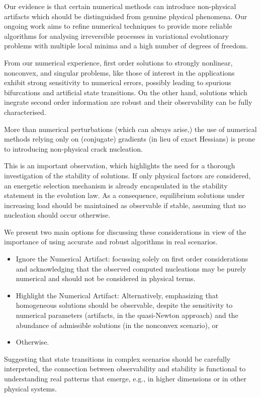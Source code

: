 \documentclass[10pt]{article}
\begin{document}
Our evidence is that certain numerical methods can introduce non-physical artifacts which should be distinguished from genuine physical phenomena. Our ongoing work aims to refine numerical techniques to provide more reliable algorithms for analysing irreversible processes in variational evolutionary problems with multiple local minima and a high number of degrees of freedom.

From our numerical experience, first order solutions to strongly nonlinear, nonconvex, and singular problems, like those of interest in the applications exhibit strong sensitivity to numerical errors, possibly leading to spurious bifurcations and artificial state transitions. On the other hand, solutions which inegrate second order information are robust and their observability can be fully characterised.

More than numerical perturbations (which can always arise,) the use of numerical methods relying only on (conjugate) gradients (in lieu of exact Hessians) is prone to introducing non-physical crack nucleation.

This is an important observation, which highlights the need for a thorough investigation of the stability of solutions. 
If only physical factors are considered, an energetic selection mechanism is already encapsulated in the stability statement in the evolution law. As a consequence, equilibrium solutions under increasing load should be maintained as observable if stable, assuming that no nucleation should occur otherwise.

We present two main options for discussing these considerations in view of the importance of using accurate and robust algorithms in real scenarios.

\begin{itemize}
    \item 
    Ignore the Numerical Artifact: focussing solely on first order considerations and acknowledging that the observed computed nucleations may be purely numerical and should not be considered in physical terms.
    \item 
    Highlight the Numerical Artifact: Alternatively, emphasizing that homogeneous solutions should be observable, despite 
    the sensitivity to numerical parameters (artifacts, in the quasi-Newton approach) and the abundance of admissible solutions (in the nonconvex scenario), or
    \item 
    Otherwise.
\end{itemize}

Suggesting that state transitions in complex scenarios should be carefully interpreted, the connection between observability and stability is functional to understanding real patterns that emerge, e.g., in higher dimensions or in other physical systems.
\end{document}
